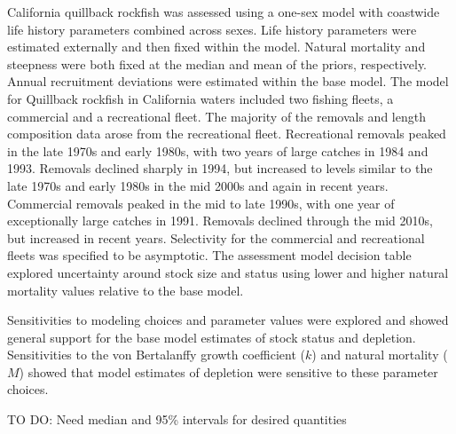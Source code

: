 \documentclass[11pt,
  english,
  a4paper,
]{article}
\begin{document}
California quillback rockfish was assessed using a one-sex model with coastwide life history parameters combined across sexes. Life history parameters were estimated externally and then fixed within the model. Natural mortality and steepness were both fixed at the median and mean of the priors, respectively. Annual recruitment deviations were estimated within the base model. The model for Quillback rockfish in California waters included two fishing fleets, a commercial and a recreational fleet. The majority of the removals and length composition data arose from the recreational fleet. Recreational removals peaked in the late 1970s and early 1980s, with two years of large catches in 1984 and 1993. Removals declined sharply in 1994, but increased to levels similar to the late 1970s and early 1980s in the mid 2000s and again in recent years. Commercial removals peaked in the mid to late 1990s, with one year of exceptionally large catches in 1991. Removals declined through the mid 2010s, but increased in recent years. Selectivity for the commercial and recreational fleets was specified to be asymptotic. The assessment model decision table explored uncertainty around stock size and status using lower and higher natural mortality values relative to the base model.

\leavevmode\tagmcend\tagstructend\par


Sensitivities to modeling choices and parameter values were explored and showed general support for the base model estimates of stock status and depletion. Sensitivities to the von Bertalanffy growth coefficient ({\(k\)\leavevmode\tagmcend\tagstructend}) and natural mortality ({\(M\)\leavevmode\tagmcend\tagstructend}) showed that model estimates of depletion were sensitive to these parameter choices.

\leavevmode\tagmcend\tagstructend\par


TO DO: Need median and 95\% intervals for desired quantities

\leavevmode\tagmcend\tagstructend\par

\clearpage

\end{document}
